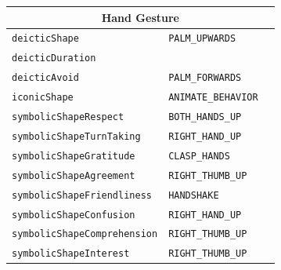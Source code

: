 \documentclass{CSSRforAfrica}
\begin{document}
\begin{table}[H]
\begin{center}
\begin{tabular}{|l l l|}
\hline
\multicolumn{3}{|c|}{{\footnotesize Hand Gesture}} \vspace{-0mm}\\
\hline
{\footnotesize \verb+deicticShape+} 	                 & {\footnotesize \verb+PALM_UPWARDS+} & {\footnotesize  }\vspace{-1.01mm}\\
{\footnotesize \verb+deicticDuration+} 	                 & {\footnotesize \verb++}  & {\footnotesize  }\vspace{-1.01mm}\\
{\footnotesize \verb+deicticAvoid+} 	                 & {\footnotesize \verb+PALM_FORWARDS+}  & {\footnotesize  }\vspace{-1.01mm}\\
{\footnotesize \verb+iconicShape+} 	                 & {\footnotesize \verb+ANIMATE_BEHAVIOR+}  & {\footnotesize  }\vspace{-1.01mm}\\
{\footnotesize \verb+symbolicShapeRespect+} 	  & {\footnotesize \verb+BOTH_HANDS_UP+ } & {\footnotesize  }\vspace{-1.01mm}\\
{\footnotesize \verb+symbolicShapeTurnTaking+}  & {\footnotesize \verb+RIGHT_HAND_UP+ } & {\footnotesize  }\vspace{-1.01mm}\\
{\footnotesize \verb+symbolicShapeGratitude+} 	  & {\footnotesize \verb+CLASP_HANDS+} & {\footnotesize  }\vspace{-1.01mm}\\
{\footnotesize \verb+symbolicShapeAgreement+}   & {\footnotesize \verb+RIGHT_THUMB_UP+}\ & {\footnotesize  }\vspace{-1.01mm}\\
{\footnotesize \verb+symbolicShapeFriendliness+}  & {\footnotesize \verb+HANDSHAKE+ } & {\footnotesize  }\vspace{-1.01mm}\\
{\footnotesize \verb+symbolicShapeConfusion+} 	   & {\footnotesize \verb+RIGHT_HAND_UP+ } & {\footnotesize  }\vspace{-1.01mm}\\
{\footnotesize \verb+symbolicShapeComprehension+} 	 & {\footnotesize \verb+RIGHT_THUMB_UP+ } & {\footnotesize  }\vspace{-1.01mm}\\
{\footnotesize \verb+symbolicShapeInterest+} 	         & {\footnotesize \verb+RIGHT_THUMB_UP+ } & {\footnotesize  }\vspace{-1.01mm}\\

\end{tabular}
\end{center}
\end{table}
\end{document}
